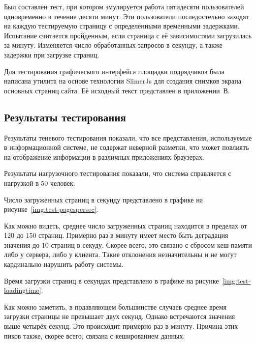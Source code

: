 Был составлен тест, при котором эмулируется работа пятидесяти пользователей одновременно в течение десяти минут.
Эти пользователи последостельно заходят на каждую тестируемую страницу с определёнными временными задержками.
Испытание считается пройденным, если страница с её зависимостями загрузилась за минуту.
Изменяется число обработанных запросов в секунду, а также задержки при загрузке страниц.

Для тестирования графического интерфейса площадки подрядчиков была написана утилита на основе технологии SlimerJs для создания снимков экрана основных страниц сайта.
Её исходный текст представлен в приложении~В.

\subsection{Результаты тестирования}

Результаты теневого тестирования показали, что все представления, используемые в информационной системе, не содержат неверной разметки, что может повлиять на отображение информации в различных приложениях-браузерах.

Результаты нагрузочного тестирования показали, что система справляется с нагрузкой в 50 человек.

Число загруженных страниц в секунду представлено в графике на рисунке~\ref{img:test-pagespersec}.


Как можно видеть, среднее число загруженных страниц находится в пределах от 120 до 150 страниц.
Примерно раз в минуту имеет место быть деградация значения до 10 страниц в секуду.
Скорее всего, это связано с сбросом кеш-памяти либо у сервера, либо у клиента.
Такие отклонения незначительны и не могут кардинально нарушить работу системы.

Время загрузки страниц в секундах представлено в графике на рисунке~\ref{img:test-loadingtime}.


Как можно заметить, в подавляющем большинстве случаев среднее время загрузки страницы не превышает двух секунд.
Однако встречаются значения выше четырёх секунд.
Это происходит примерно раз в минуту.
Причина этих пиков также, скорее всего, связана с кешированием данных.

